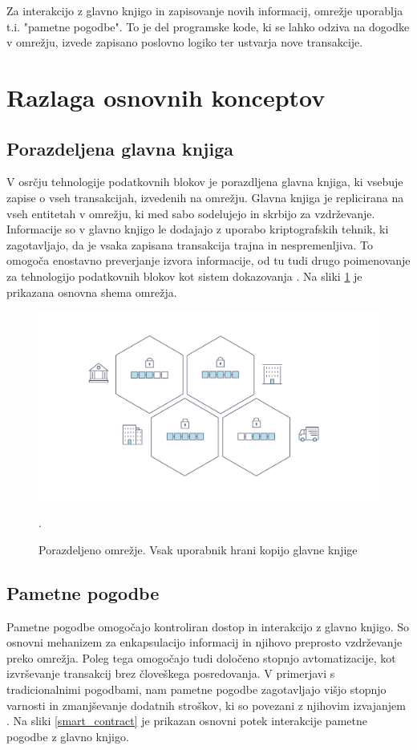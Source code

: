 \documentclass[a4paper, 12pt]{book}
\begin{document}
Za interakcijo z glavno knjigo in zapisovanje novih informacij, omrežje uporablja t.i. "pametne pogodbe". \cite{hyperledgerDocs}
To je del programske kode, ki se lahko odziva na dogodke v omrežju, izvede zapisano poslovno logiko ter ustvarja nove transakcije.

\section{Razlaga osnovnih konceptov}

\subsection{Porazdeljena glavna knjiga}
V osrčju tehnologije podatkovnih blokov je porazdljena glavna knjiga, ki vsebuje zapise o vseh transakcijah, izvedenih na omrežju.
Glavna knjiga je replicirana na vseh entitetah v omrežju, ki med sabo sodelujejo in skrbijo za vzdrževanje.
Informacije so v glavno knjigo le dodajajo z uporabo kriptografskih tehnik, ki zagotavljajo, da je vsaka zapisana transakcija trajna in nespremenljiva.
To omogoča enostavno preverjanje izvora informacije, od tu tudi drugo poimenovanje za tehnologijo podatkovnih blokov kot sistem dokazovanja \cite{hyperledgerDocs}.
Na sliki \ref{hyperledger_basic_network} je prikazana osnovna shema omrežja.

\begin{figure}[h]
	\includegraphics[width=1.0\textwidth]{slike/basic_network.png}
	\label{hyperledger_basic_network}
	\caption{Porazdeljeno omrežje. Vsak uporabnik hrani kopijo glavne knjige \cite{hyperledgerDocs}}.
\end{figure}

\subsection{Pametne pogodbe}
Pametne pogodbe omogočajo kontroliran dostop in interakcijo z glavno knjigo.
So osnovni mehanizem za enkapsulacijo informacij in njihovo preprosto vzdrževanje preko omrežja.
Poleg tega omogočajo tudi določeno stopnjo avtomatizacije, kot izvrševanje transakcij brez človeškega posredovanja.
V primerjavi s tradicionalnimi pogodbami, nam pametne pogodbe zagotavljajo višjo stopnjo varnosti in zmanjševanje dodatnih stroškov, ki so povezani z njihovim izvajanjem \cite{atzei2017survey}.
Na sliki \ref{smart_contract} je prikazan osnovni potek interakcije pametne pogodbe z glavno knjigo.
\end{document}
